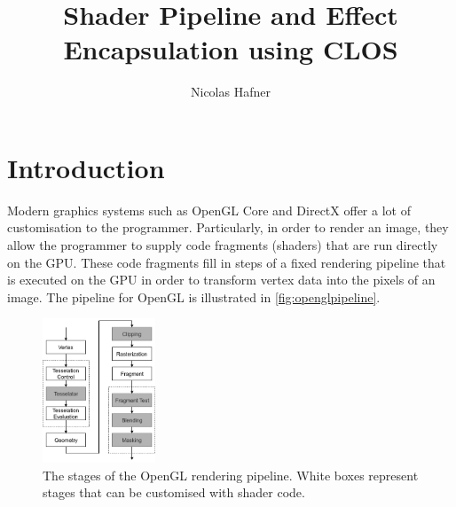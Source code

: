 \documentclass[format=sigconf]{acmart}
\begin{document}
\title{Shader Pipeline and Effect Encapsulation using CLOS}

\author{Nicolas Hafner}

\begin{abstract}
\end{abstract}

\begin{CCSXML}
\end{CCSXML}


\maketitle

\newpage

\def\abovecaptionskip{1pt}
\def\listingautorefname{listing}
\def\figureautorefname{figure}

\section{Introduction}\label{introduction}
Modern graphics systems such as OpenGL Core and DirectX offer a lot of customisation to the programmer. Particularly, in order to render an image, they allow the programmer to supply code fragments (shaders) that are run directly on the GPU. These code fragments fill in steps of a fixed rendering pipeline that is executed on the GPU in order to transform vertex data into the pixels of an image. The pipeline for OpenGL is illustrated in \autoref{fig:openglpipeline}.

\begin{figure}[h]
  \begin{center}
    \includegraphics[width=0.3\textwidth]{opengl-pipeline.png}
  \end{center}
  \caption{The stages of the OpenGL rendering pipeline. White boxes represent stages that can be customised with shader code.}
  \label{fig:openglpipeline}
\end{figure}
\end{document}
